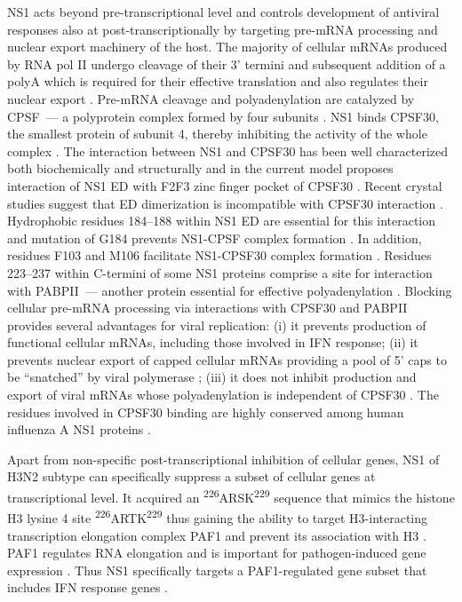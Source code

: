 		NS1 acts beyond pre-transcriptional level and controls development of antiviral responses also at post-transcriptionally by targeting pre-mRNA processing and nuclear export machinery of the host.
		The majority of cellular mRNAs produced by RNA pol II undergo cleavage of their 3' termini and subsequent addition of a \gls{polyA} which is required for their effective translation and also regulates their nuclear export \parencite{Vassalli1989, Zarkower1987, Huang1996}. Pre-mRNA cleavage and polyadenylation are catalyzed by \gls{CPSF}~--- a polyprotein complex formed by four subunits \parencite{Wilusz1990, Colgan1997}. NS1 binds \gls{CPSF}30, the smallest protein of subunit 4, thereby inhibiting the activity of the whole complex \parencite{Nemeroff1998}. The interaction between NS1 and \gls{CPSF}30 has been well characterized both biochemically and structurally and in the current model proposes interaction of NS1 ED with F2F3 zinc finger pocket of \gls{CPSF}30 \parencite{Noah2003, Twu2006, Kochs2007, Das2008}. Recent crystal studies suggest that ED dimerization is incompatible with \gls{CPSF}30 interaction \parencite{Aramini2011, Kerry2011}. Hydrophobic residues 184--188 within NS1 ED are essential for this interaction and mutation of G184 prevents NS1-CPSF complex formation \parencite{Das2008}. In addition, residues F103 and M106 facilitate NS1-CPSF30 complex formation \parencite{Kochs2007, Das2008}. Residues 223--237 within C-termini of some \gls{NS1} proteins comprise a site for interaction with \gls{PABP}II~--- another protein essential for effective polyadenylation \parencite{Li2001a}. Blocking cellular pre-mRNA processing via interactions with \gls{CPSF}30 and \gls{PABP}II provides several advantages for viral replication: (i) it prevents production of functional cellular mRNAs, including those involved in \gls{IFN} response; (ii) it prevents nuclear export of capped cellular mRNAs providing a pool of 5' caps to be ``snatched'' by viral polymerase \parencite{Nemeroff1998}; (iii) it does not inhibit production and export of viral mRNAs whose polyadenylation is independent of \gls{CPSF}30 \parencite{Plotch1977}. The residues involved in \gls{CPSF}30 binding are highly conserved among human influenza A NS1 proteins \parencite{Kochs2007, Das2008}. 
		
		Apart from non-specific post-transcriptional inhibition of cellular genes, NS1 of H3N2 subtype can specifically suppress a subset of cellular genes at transcriptional level. It acquired an \textsuperscript{226}ARSK\textsuperscript{229} sequence that mimics the histone H3 lysine 4 site \textsuperscript{226}ARTK\textsuperscript{229} thus gaining the ability to target  H3-interacting transcription elongation complex PAF1 and prevent its association with H3 \parencite{Marazzi2012}. PAF1 regulates RNA elongation and is important for pathogen-induced gene expression \parencite{Newey2009}. Thus NS1 specifically targets a PAF1-regulated gene subset that includes \gls{IFN} response genes \parencite{Marazzi2012}.
		
